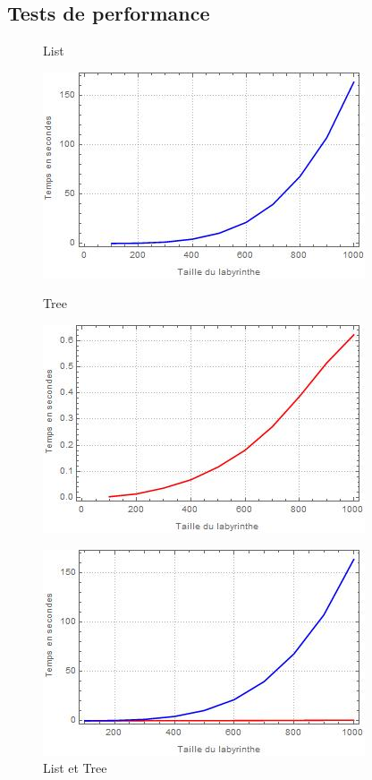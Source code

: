 \documentclass[11pt]{article}
\begin{document}
\subsection{Tests de performance}
\begin{figure}[ht]
  \centering
  \begin{minipage}[h]{0.4\textwidth}
  \caption{List}
    \includegraphics[width=\textwidth]{List_graph.jpg}
  \label{list}  
  \end{minipage}
  \hfill
  \begin{minipage}[h]{0.4\textwidth}
  \caption{Tree}
    \includegraphics[width=\textwidth]{Tree_graph.jpg}
  \label{tree}
  \end{minipage}
  \begin{minipage}[h]{0.4\textwidth} 
  \caption{List et Tree}
    \includegraphics[width=\textwidth]{List_Tree_graph.jpg} 

\end{minipage}
\end{figure}
\end{document}
